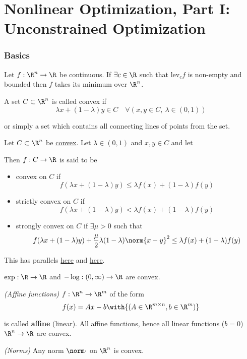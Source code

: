 \chapter{Nonlinear Optimization, Part I: Unconstrained Optimization}\label{fe5d4a2}

\subsection{Basics}\label{afa61c4}

\def\pd{\succ} %
\def\psd{\succeq} %

\Proposition{}\label{bd1eec0}

Let $f:\R^n\to\R$ be continuous. If $\exists c\in\R$ such that $\text{lev}_cf$
is non-empty and bounded then $f$ takes its minimum over $\R^n$.

\label{e012971}

A set $C\subset\R^n$ is called convex if
$$
  \lambda x+(1-\lambda)y\in C\quad
  \forall(x,y\in C,\ \lambda\in(0,1))
$$

or simply a set which contains all connecting lines of points from the set.

\label{a114065}

Let $C\subset\R^n$ be \href{e012971}{convex}. Let $\lambda\in(0,1)$ and $x,y\in
C$ and let

Then $f:C\to\R$ is said to be

\begin{itemize}
  \item convex on $C$ if
        $$
          f(\lambda x+(1-\lambda)y)\leq\lambda f(x)+(1-\lambda)f(y)
        $$
  \item strictly convex on $C$ if
        $$
          f(\lambda x+(1-\lambda)y)<\lambda f(x)+(1-\lambda)f(y)
        $$
  \item strongly convex on $C$ if $\exists\mu>0$ such that
        $$
          f(\lambda x+(1-\lambda)y)+\frac{\mu}{2}\lambda(1-\lambda)\norm{x-y}^2\leq\lambda f(x)+(1-\lambda)f(y)
        $$
\end{itemize}

This has parallels \href{cd9cea7}{here} and \href{a8ddd0c}{here}.

\label{f96c8ae}

\begin{enumerata}
  \item $\exp:\R\to\R$ and $-\log:(0,\infty)\to\R$ are convex.
  \item \textit{(Affine functions)} $f:\R^n\to\R^m$ of the form
  $$
    f(x)=Ax-b\with{(A\in\R^{m\times n},b\in\R^m)}
  $$

  is called \textbf{affine} (linear). All affine functions, hence all linear
  functions ($b=0$) $\R^n\to\R$ are convex.
  \item \textit{(Norms)} Any norm $\norm\cdot$ on $\R^n$ is convex.
\end{enumerata}


